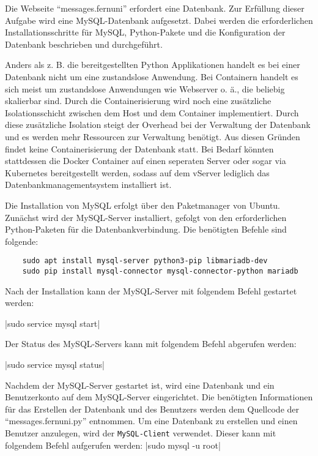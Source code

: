 Die Webseite \enquote{messages.fernuni} erfordert eine Datenbank. Zur Erfüllung dieser Aufgabe wird eine MySQL-Datenbank aufgesetzt. Dabei werden die erforderlichen Installationsschritte für MySQL, Python-Pakete und die Konfiguration der Datenbank beschrieben und durchgeführt.

Anders als z. B. die bereitgestellten Python Applikationen handelt es bei einer Datenbank nicht um eine zustandslose Anwendung. Bei Containern handelt es sich meist um zustandslose Anwendungen wie Webserver o. ä., die beliebig skalierbar sind. Durch die Containerisierung wird noch eine zusätzliche Isolationsschicht zwischen dem Host und dem Container implementiert. Durch diese zusätzliche Isolation steigt der Overhead bei der Verwaltung der Datenbank und es werden mehr Ressourcen zur Verwaltung benötigt. Aus diesen Gründen findet keine Containerisierung der Datenbank statt. Bei Bedarf könnten stattdessen die Docker Container auf einen seperaten Server oder sogar via Kubernetes bereitgestellt werden, sodass auf dem vServer lediglich das Datenbankmanagementsystem installiert ist.

Die Installation von MySQL erfolgt über den Paketmanager von Ubuntu. Zunächst wird der MySQL-Server installiert, gefolgt von den erforderlichen Python-Paketen für die Datenbankverbindung. Die benötigten Befehle sind folgende:

\begin{verbatim}
    sudo apt install mysql-server python3-pip libmariadb-dev
    sudo pip install mysql-connector mysql-connector-python mariadb
\end{verbatim}

Nach der Installation kann der MySQL-Server mit folgendem Befehl gestartet werden:

|sudo service mysql start|

Der Status des MySQL-Servers kann mit folgendem Befehl abgerufen werden:

|sudo service mysql status|

Nachdem der MySQL-Server gestartet ist, wird eine Datenbank und ein Benutzerkonto auf dem MySQL-Server eingerichtet. Die benötigten Informationen für das Erstellen der Datenbank und des Benutzers werden dem Quellcode der \enquote{messages.fernuni.py} entnommen.
Um eine Datenbank zu erstellen und einen Benutzer anzulegen, wird der \verb+MySQL-Client+ verwendet. Dieser kann mit folgendem Befehl aufgerufen werden:
|sudo mysql -u root|

